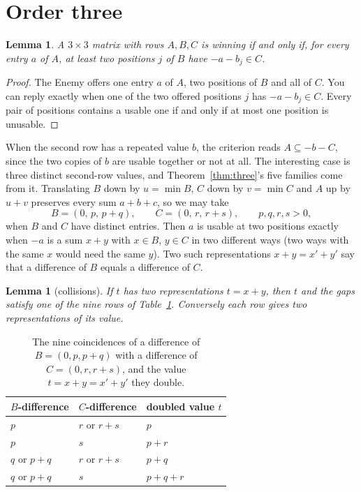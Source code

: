 \documentclass[11pt]{article}
\newtheorem{lemma}[theorem]{Lemma}
\theoremstyle{definition}
\theoremstyle{remark}
\begin{document}
\section{Order three}\label{sec:three}

\begin{lemma}\label{lem:crit}
A $3\times3$ matrix with rows $A,B,C$ is winning if and only if, for every entry $a$ of $A$, at least two positions $j$ of $B$ have $-a-b_j\in C$.
\end{lemma}

\begin{proof}
The Enemy offers one entry $a$ of $A$, two positions of $B$ and all of $C$. You can reply exactly when one of the two offered positions $j$ has $-a-b_j\in C$. Every pair of positions contains a usable one if and only if at most one position is unusable.
\end{proof}

When the second row has a repeated value $b$, the criterion reads $A\subseteq -b-C$, since the two copies of $b$ are usable together or not at all. The interesting case is three distinct second-row values, and Theorem~\ref{thm:three}'s five families come from it. Translating $B$ down by $u=\min B$, $C$ down by $v=\min C$ and $A$ up by $u+v$ preserves every sum $a+b+c$, so we may take
\[
B=(0,\,p,\,p+q),\qquad C=(0,\,r,\,r+s),\qquad p,q,r,s>0,
\]
when $B$ and $C$ have distinct entries. Then $a$ is usable at two positions exactly when $-a$ is a sum $x+y$ with $x\in B$, $y\in C$ in two different ways (two ways with the same $x$ would need the same $y$). Two such representations $x+y=x'+y'$ say that a difference of $B$ equals a difference of $C$.

\begin{lemma}[collisions]\label{lem:coll}
If $t$ has two representations $t=x+y$, then $t$ and the gaps satisfy one of the nine rows of Table~\ref{tab:coll}. Conversely each row gives two representations of its value.
\end{lemma}

\begin{table}[ht]
\centering
\begin{tabular}{lll}
\toprule
$B$-difference & $C$-difference & doubled value $t$\\
\midrule
$p$ & $r$ or $r+s$ & $p$\\
$p$ & $s$ & $p+r$\\
$q$ or $p+q$ & $r$ or $r+s$ & $p+q$\\
$q$ or $p+q$ & $s$ & $p+q+r$\\
\bottomrule
\end{tabular}
\caption{The nine coincidences of a difference of $B=(0,p,p+q)$ with a difference of $C=(0,r,r+s)$, and the value $t=x+y=x'+y'$ they double.}
\label{tab:coll}
\end{table}
\end{document}
